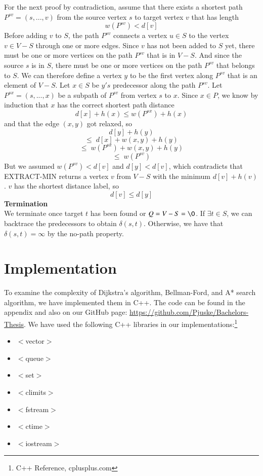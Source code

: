 \documentclass[11pt]{article}
\begin{document}
\noindent For the next proof by contradiction, assume that there exists a shortest path $P^{sv}=(s, ..., v)$ from the source vertex $s$ to target vertex $v$ that has length $$w(P^{sv}) < d[v]$$
Before adding $v$ to $S$, the path $P^{sv}$ connects a vertex $u\in S$ to the vertex $v\in V-S$ through one or more edges. Since $v$ has not been added to $S$ yet, there must be one or more vertices on the path $P^{sv}$ that is in $V-S$. And since the source $s$ is in $S$, there must be one or more vertices on the path $P^{sv}$ that belongs to $S$. We can therefore define a vertex $y$ to be the first vertex along $P^{sv}$ that is an element of $V-S$. Let $x\in S$ be $y's$ predecessor along the path $P^{sv}$. Let $P^{sx}=(s, ..., x)$ be a subpath of $P^{sv}$ from vertex $s$ to $x$. Since $x \in P$, we know by induction that $x$ has the correct shortest path distance $$d[x] + h(x) \leq w(P^{sx}) + h(x)$$and that the edge $(x,y)$ got relaxed, so $$d[y]+h(y)$$ 
$$\leq \; d[x]+w(x,y)+h(y)$$
$$\leq \; w(P^{sx}) + w(x,y) + h(y)$$
$$\leq \; w(P^{sv})$$But we assumed $w(P^{sv}) < d[v]$ and $d[y] < d[v]$, which contradicts that EXTRACT-MIN returns a vertex $v$ from $V-S$ with the minimum $d[v]+h(v)$. $v$ has the shortest distance label, so $$d[v] \leq d[y]$$
\textbf{Termination}\\
We terminate once target $t$ has been found or $Q = V-S =\O$. If $\exists t \in S$, we can backtrace the predecessors to obtain $\delta(s,t)$. Otherwise, we have that $\delta(s,t) = \infty$ by the no-path property.\\


\section{Implementation}
To examine the complexity of Dijkstra's algorithm, Bellman-Ford, and A* search algorithm, we have implemented them in C++. The code can be found in the appendix and also on our GitHub page: \url{https://github.com/Pjuske/Bachelors-Thesis}. We have used the following C++ libraries in our implementations:\footnote{C++ Reference, cplusplus.com}

\begin{itemize}
\item $<$vector$>$
\item $<$queue$>$
\item $<$set$>$
\item$<$climits$>$
\item $<$fstream$>$
\item$<$ctime$>$
\item $<$iostream$>$
\end{itemize}
\end{document}
